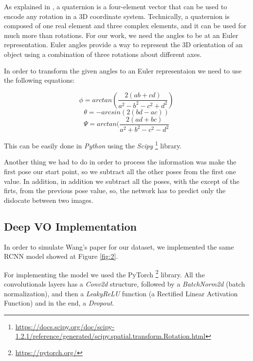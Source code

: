             As explained in , a quaternion is a four-element vector that can be used to encode any rotation in a 3D coordinate system.  Technically, a quaternion is composed of one real element and three complex elements, and it can be used for much more than rotations. For our work, we need the angles to be at an Euler representation. Euler angles provide a way to represent the 3D orientation of an object using a combination of three rotations about different axes.
            
            In order to transform the given angles to an Euler representaion we need to use the following equations:
            
            \begin{equation}
                \phi = arctan(\frac{2(ab+cd)}{a^2 - b^2 - c^2 + d^2})
            \end{equation}
            \begin{equation}
                \theta = -arcsin(2(bd-ac))
            \end{equation}
            \begin{equation}
                \Psi = arctan(\frac{2(ad+bc)}{a^2 + b^2 - c^2 - d^2}
            \end{equation}
            
            This can be easily done in \emph{Python} using the \emph{Scipy} \footnote{\url{https://docs.scipy.org/doc/scipy-1.2.1/reference/generated/scipy.spatial.transform.Rotation.html}} library.
            
            Another thing we had to do in order to process the information was make the first pose our start point, so we subtract all the other poses from the first one value. In addition, in addition we subtract all the poses, with the except of the firts, from the previous pose value, so, the network has to predict only the dislocate between two images.
            
    \subsection{Deep VO Implementation}
        In order to simulate Wang's\cite{wang2017deepvo} paper for our dataset, we implemented the same RCNN model showed at Figure \ref{fig:2}.
        
        For implementing the model we used the PyTorch \footnote{\url{https://pytorch.org/}} library. All the convolutionals layers has a \emph{Conv2d} structure, followed by a \emph{BatchNorm2d} (batch normalization), and then a \emph{LeakyReLU} function (a Rectified Linear Activation Function) and in the end, a \emph{Dropout}.
        
